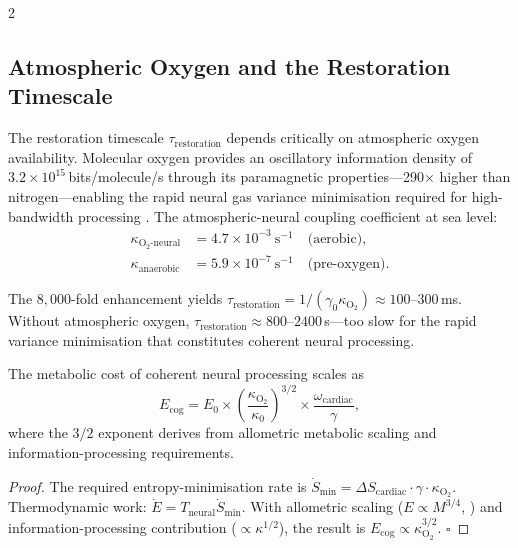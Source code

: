 \begin{multicols}{2}
\subsection{Atmospheric Oxygen and the Restoration Timescale}

The restoration timescale $\tau_{\mathrm{restoration}}$ depends critically on atmospheric oxygen availability. Molecular oxygen provides an oscillatory information density of $3.2 \times 10^{15}$\,bits/molecule/s through its paramagnetic properties---290$\times$ higher than nitrogen---enabling the rapid neural gas variance minimisation required for high-bandwidth processing \citep{sachikonye2024_metabolic}. The atmospheric-neural coupling coefficient at sea level:
\begin{align}
\kappa_{\mathrm{O_2\text{-}neural}} &= 4.7 \times 10^{-3}~\text{s}^{-1} \quad \text{(aerobic)},\\
\kappa_{\mathrm{anaerobic}} &= 5.9 \times 10^{-7}~\text{s}^{-1} \quad \text{(pre-oxygen)}.
\end{align}

The $8{,}000$-fold enhancement yields $\tau_{\mathrm{restoration}} = 1/(\gamma_0\kappa_{\mathrm{O_2}}) \approx 100$--$300$\,ms. Without atmospheric oxygen, $\tau_{\mathrm{restoration}} \approx 800$--$2400$\,s---too slow for the rapid variance minimisation that constitutes coherent neural processing.

\begin{theorem}
\label{thm:ch08-oxygen}
The metabolic cost of coherent neural processing scales as
\begin{equation}
E_{\mathrm{cog}} = E_0 \times \left(\frac{\kappa_{\mathrm{O_2}}}{\kappa_0}\right)^{3/2} \times \frac{\omega_{\mathrm{cardiac}}}{\gamma},
\label{eq:ch08-Ecog}
\end{equation}
where the $3/2$ exponent derives from allometric metabolic scaling and information-processing requirements.
\end{theorem}

\begin{proof}
The required entropy-minimisation rate is $\dot{S}_{\mathrm{min}} = \Delta S_{\mathrm{cardiac}}\cdot\gamma\cdot\kappa_{\mathrm{O_2}}$. Thermodynamic work: $\dot{E} = T_{\mathrm{neural}}\dot{S}_{\mathrm{min}}$. With allometric scaling ($E \propto M^{3/4}$, \citep{west1997general, brown2004toward}) and information-processing contribution ($\propto \kappa^{1/2}$), the result is $E_{\mathrm{cog}} \propto \kappa_{\mathrm{O_2}}^{3/2}$. $\square$
\end{proof}


\end{multicols}
